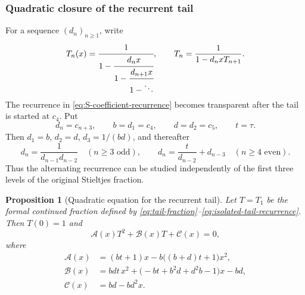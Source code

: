 \documentclass[11pt]{article}
\newtheorem{proposition}[theorem]{Proposition}
\theoremstyle{remark}
\begin{document}
\subsubsection{Quadratic closure of the recurrent tail}
\label{subsec:tail-closure}
For a sequence $(d_n)_{n\geq1}$, write
\begin{equation}
 T_n(x)=\cfrac{1}{1-\cfrac{d_nx}{1-\cfrac{d_{n+1}x}{1-\ddots}}},
 \qquad T_n=\frac{1}{1-d_nxT_{n+1}}.
 \label{eq:tail-fraction}
\end{equation}
The recurrence in \eqref{eq:S-coefficient-recurrence} becomes transparent
after the tail is started at $c_4$. Put
\begin{equation}
 d_n=c_{n+3},\qquad b=d_1=c_4,\qquad d=d_2=c_5,\qquad t=\tau.
 \label{eq:tail-reindexing}
\end{equation}
Then $d_1=b$, $d_2=d$, $d_3=1/(bd)$, and thereafter
\begin{equation}
 d_n=\frac1{d_{n-1}d_{n-2}}\quad(n\geq3\text{ odd}),\qquad
 d_n=\frac{t}{d_{n-2}}+d_{n-3}\quad(n\geq4\text{ even}).
 \label{eq:isolated-tail-recurrence}
\end{equation}
Thus the alternating recurrence can be studied independently of the first
three levels of the original Stieltjes fraction.

\begin{proposition}[Quadratic equation for the recurrent tail]
\label{prop:tail-quadratic}
Let $T=T_1$ be the formal continued fraction defined by
\eqref{eq:tail-fraction}--\eqref{eq:isolated-tail-recurrence}. Then $T(0)=1$ and
\begin{equation}
 \mathcal A(x)T^2+\mathcal B(x)T+\mathcal C(x)=0,
 \label{eq:tail-quadratic}
\end{equation}
where
\begin{align}
 \mathcal A(x)&=(bt+1)x-b\bigl((b+d)t+1\bigr)x^2,
 \label{eq:tail-A}\\
 \mathcal B(x)&=bdt\,x^2+\bigl(-bt+b^2d+d^2b-1\bigr)x-bd,
 \label{eq:tail-B}\\
 \mathcal C(x)&=bd-bd^2x.
 \label{eq:tail-C}
\end{align}
\end{proposition}
\end{document}
